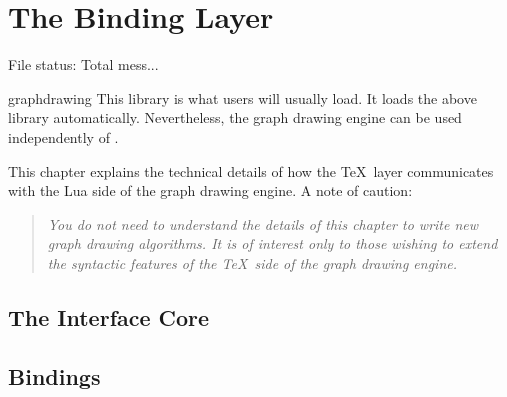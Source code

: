 %
%
%


\section{The Binding Layer}

{}

\label{section-gd-binding-layer}

\label{section-base-graphdrawing}
\label{section-gd-internals}

File status: Total mess...


\begin{pgflibrary}{graphdrawing}
  This library is what users will usually load. It loads the above
  library automatically. Nevertheless, the graph drawing engine can be
  used independently of \tikzname.
\end{pgflibrary}


This chapter explains the technical details of how the \TeX\ layer
communicates with the Lua side of the graph drawing engine. A note of
caution:

\begin{quote}
  \itshape You do not need to understand the details of this
  chapter to write new graph drawing algorithms. It is of interest
  only to those wishing to extend the syntactic features of the \TeX\ side
  of the graph drawing engine.
\end{quote}

\subsection{The Interface Core}




\subsection{Bindings}

